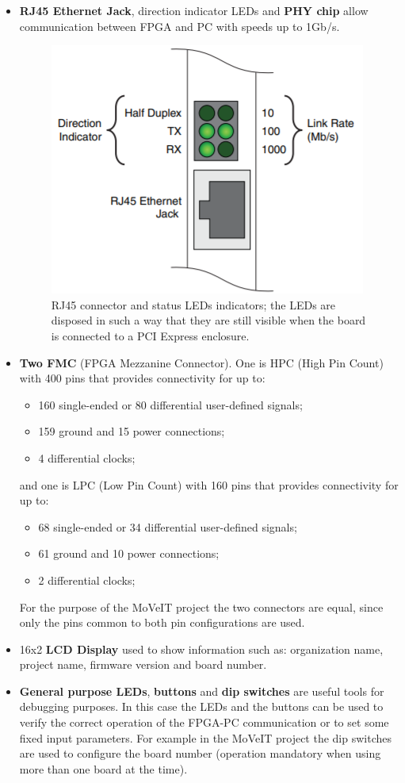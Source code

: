 \begin{itemize}
	\item \textbf{RJ45 Ethernet Jack}, direction indicator LEDs and \textbf{PHY chip} allow communication between FPGA and PC with speeds up to 1Gb/s.
	 \begin{figure}[H]
	 	\centering
	 	\includegraphics[width=0.2\linewidth]{IMG/ch3/PHY}
	 	\caption{RJ45 connector and status LEDs indicators; the LEDs are disposed in such a way that they are still visible when the board is connected to a PCI Express enclosure.}
	 	\label{fig:phy}
	 \end{figure}
	\item \textbf{Two FMC} (FPGA Mezzanine Connector). One is HPC (High Pin Count) with 400 pins that provides connectivity for up to:
	\begin{itemize}
		\item 160 single-ended or 80 differential user-defined signals;
		\item 159 ground and 15 power connections;
		\item 4 differential clocks;
	\end{itemize}
	\noindent and one is LPC (Low Pin Count) with 160 pins that provides connectivity for up to:
	\begin{itemize}
		\item 68 single-ended or 34 differential user-defined signals;
		\item 61 ground and 10 power connections;
		\item 2 differential clocks;
	\end{itemize}
	For the purpose of the MoVeIT project the two connectors are equal, since only the pins common to both pin configurations are used.
	\item 16x2 \textbf{LCD Display} used to show information such as: organization name, project name, firmware version and board number.
	\item \textbf{General purpose LEDs}, \textbf{buttons} and \textbf{dip switches} are useful tools for debugging purposes. In this case the LEDs and the buttons can be used to verify the correct operation of the FPGA-PC communication or to set some fixed input parameters. For example in the MoVeIT project the dip switches are used to configure the board number (operation mandatory when using more than one board at the time).  

\end{itemize}
